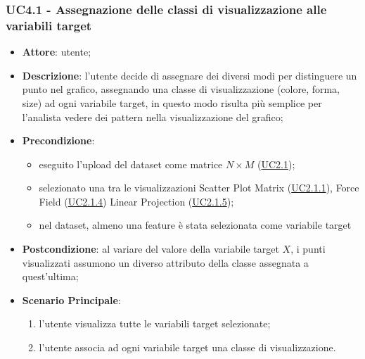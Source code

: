  \subsubsection{UC4.1 - Assegnazione delle classi di visualizzazione alle variabili target}
    \label{uc4.1}
    \begin{itemize}
    \item \textbf{Attore}: utente;
    \item \textbf{Descrizione}: l'utente decide di assegnare dei diversi modi per distinguere un punto nel grafico, assegnando una classe di visualizzazione (colore, forma, size) ad ogni variabile target, in questo modo risulta più semplice per l'analista vedere dei pattern nella visualizzazione del grafico;
    \item \textbf{Precondizione}:
    \begin{itemize}
        \item eseguito l'upload del dataset come matrice $N\times M$ (\hyperref[uc2.1]{UC2.1});
        \item selezionato una tra le visualizzazioni Scatter Plot Matrix (\hyperref[uc2.1.1]{UC2.1.1}), Force Field (\hyperref[uc2.1.4]{UC2.1.4}) Linear Projection (\hyperref[uc2.1.5]{UC2.1.5});
        \item nel dataset, almeno una feature è stata selezionata come variabile target
    \end{itemize}
    \item \textbf{Postcondizione}: al variare del valore della variabile target $X$, i punti visualizzati assumono un diverso attributo della classe assegnata a quest'ultima;
    \item \textbf{Scenario Principale}: 
    \begin{enumerate}
        \item l'utente visualizza tutte le variabili target selezionate;
        \item l'utente associa ad ogni variabile target una classe di visualizzazione.
    \end{enumerate}  
    \end{itemize}
    
